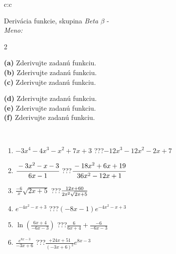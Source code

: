 \documentclass[10pt]{report}
\begin{document}
\newpage
\thispagestyle{empty}
\begin{tabular}{c:c}
\begin{minipage}[c][104.5mm][t]{0.5\linewidth}
\begin{center}
\vspace{7mm}
{\huge Derivácia funkcie, skupina \textit{Beta $\beta$} -}\\[5mm]
\textit{Meno:}\phantom{xxxxxxxxxxxxxxxxxxxxxxxxxxxxxxxxxxxxxxxxxxxxxxxxxxxxxxxxxxxxxxxxx}\\[5mm]
\begin{minipage}{0.95\linewidth}
\begin{center}
{\small \begin{multicols}{2} \raggedright
\textbf{(a)} Zderivujte zadanú funkciu. \\[1mm]
\textbf{(b)} Zderivujte zadanú funkciu. \\[1mm]
\textbf{(c)} Zderivujte zadanú funkciu. \par \columnbreak
\textbf{(d)} Zderivujte zadanú funkciu. \\[1mm]
\textbf{(e)} Zderivujte zadanú funkciu. \\[1mm]
\textbf{(f)} Zderivujte zadanú funkciu.
\end{multicols}
}
\end{center}
\end{minipage}
\\[4mm]
\begin{minipage}{0.79\linewidth}
\begin{center}
\begin{varwidth}{\linewidth}
\begin{enumerate}
\normalsize
\item $-3x^4-4x^3-x^2+7x+3$\quad \dotfill\; ???\;\dotfill \quad $-12x^3-12x^2-2x+7$
\item $\cfrac{-3x^2-x-3}{6x-1}$\quad \dotfill\; ???\;\dotfill \quad $\cfrac{-18x^2+6x+19}{36x^2-12x+1}$
\item $\frac{-6}{x}\sqrt{2x+5}$\quad \dotfill\; ???\;\dotfill \quad $\frac{12x+60}{2x^2 \sqrt{\smash[b]{2x+5}}}$
\item $e^{-4x^2-x+3}$\quad \dotfill\; ???\;\dotfill \quad $(-8x-1)e^{-4x^2-x+3}$
\item $\ln{\left(\frac{6x+4}{-6x-3}\right)}$\quad \dotfill\; ???\;\dotfill \quad $\frac{6}{6x+4}+\frac{-6}{-6x-3}$
\item $\frac{e^{8x-3}}{-3x+6}$\quad \dotfill\; ???\;\dotfill \quad $\frac{+24x+51}{(-3x+6)^2}e^{8x-3}$
\end{enumerate}

\end{varwidth}
\end{center}
\end{minipage}
\end{center}
\end{minipage}
\end{tabular}
\end{document}
